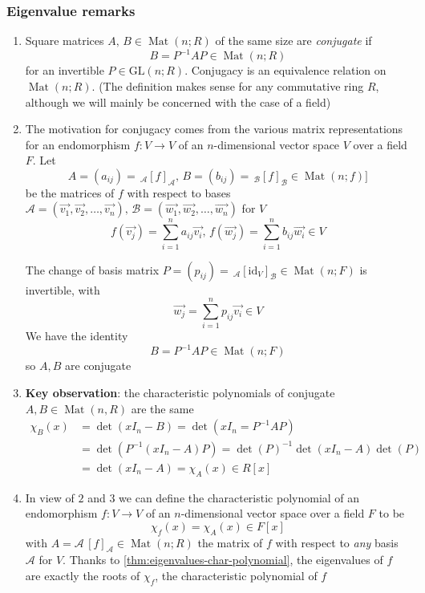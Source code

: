 \documentclass{article}
\DeclareMathOperator{\Mat}{Mat}
\begin{document}
\subsubsection{Eigenvalue remarks}
\begin{enumerate}
    \item Square matrices $A,\,B\in \Mat(n;R)$ of the same size are \textit{conjugate} if
        \[B = P^{-1}AP\in \Mat(n;R)\]
    for an invertible $P\in \text{GL}(n;R)$. Conjugacy is an equivalence relation on $\Mat(n;R)$. (The definition makes sense for any commutative ring $R$, although we will mainly be concerned with the case of a field)
    \item The motivation for conjugacy comes from the various matrix representations for an endomorphism $f : V \to V$ of an $n$-dimensional vector space $V$ over a field $F$. Let
        \[A = (a_{ij}) =\,_{\mathcal{A}}[f]_{\mathcal{A}},\,B = (b_{ij}) =\,_{\mathcal{B}}[f]_{\mathcal{B}}\in \Mat(n;f)]\]
        be the matrices of $f$ with respect to bases $\mathcal{A} = (\vec{v_{1}}, \vec{v_{2}},\dots,\vec{v_{n}}),\,\mathcal{B} = (\vec{w_{1}}, \vec{w_{2}},\dots,\vec{w_{n}})$ for $V$
        \[f(\vec{v_{j}}) = \sum_{i = 1}^{n}a_{ij}\vec{v_{i}},\,f(\vec{w_{j}}) = \sum_{i = 1}^{n}b_{ij}\vec{w_{i}}\in V\]

        The change of basis matrix $P = (p_{ij}) =\,_{\mathcal{A}} [\text{id}_{V}]_{\mathcal{B}}\in \Mat(n;F)$ is invertible, with
        \[\vec{w_{j}} = \sum_{i = 1}^{n}p_{ij}\vec{v_{i}}\in V\]
        We have the identity
        \[B = P^{-1}AP\in \Mat(n;F)\]
        so $A,B$ are conjugate
    \item \textbf{Key observation}: the characteristic polynomials of conjugate $A,B\in \Mat(n,R)$ are the same
        \begin{align*}
            \chi_{B}(x) &= \det(x I_{n} - B) = \det(x I_{n} = P^{-1}AP) \\
            &= \det(P^{-1}(x I_{n} - A)P) = \det(P)^{-1}\det(x I_{n} - A)\det(P) \\
            &= \det(xI_{n} - A) = \chi_{A}(x)\in R[x]
        \end{align*}
    \item In view of $2$ and $3$ we can define the characteristic polynomial of an endomorphism $f : V\to V$ of an $n$-dimensional vector space over a field $F$ to be
        \[\chi_{f}(x) = \chi_{A}(x)\in F[x]\]
        with $A =\mathcal{A}\,[f]_{\mathcal{A}}\in \Mat(n;R)$ the matrix of $f$ with respect to \textit{any} basis $\mathcal{A}$ for $V$. Thanks to \ref{thm:eigenvalues-char-polynomial}, the eigenvalues of $f$ are exactly the roots of $\chi_{f}$, the characteristic polynomial of $f$
\end{enumerate}
\end{document}
